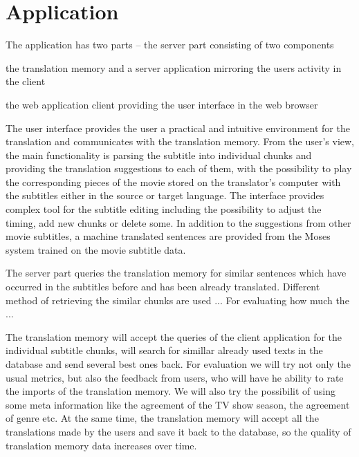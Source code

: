 
\section{Application}

The application has two parts -- the server part consisting of  two components
\begin{smallenumerate}
\item the translation memory and a server application mirroring the users activity in the client
\item the web application client providing the user interface in the web browser
\end{smallenumerate}

The user interface provides the user a practical and intuitive environment for the translation and  communicates with the translation memory.%
From the user's view, the main functionality is parsing the subtitle into individual chunks %
and providing the translation suggestions to each of them,  with the possibility to play the corresponding pieces of the movie stored on the translator's computer with the subtitles either in the source or target language. 
The interface provides complex tool for the subtitle editing including the possibility to adjust the timing, add new chunks or delete some. %
In addition to the suggestions from other movie subtitles, a machine translated sentences are provided from the Moses system trained on the movie subtitle data.

The server part queries the translation memory for similar sentences which have occurred in the subtitles before and has been already translated. Different method of retrieving the similar chunks are used ... For evaluating how much the ...

The translation memory will accept the queries of the client application for the individual subtitle chunks, will search for simillar already used texts in the database and send several best ones back. For evaluation we will try not only the usual metrics, but also the feedback from users, who will have he ability to rate the imports of the translation memory. We will also try the possibilit of using some meta information like the agreement %
of the TV show season, the agreement of genre etc. At the same time, the translation memory will accept all the translations made by the users and save it back to the database, so the quality of translation memory data increases over time.


